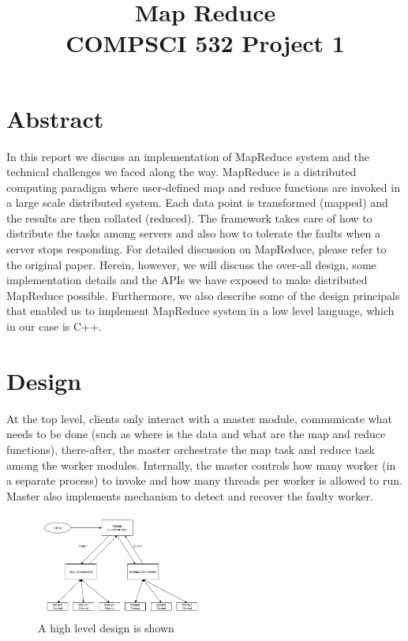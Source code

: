 \documentclass[conference, a4paper]{IEEEtran_ID}
\begin{document}
\title{Map Reduce \\ 
\LARGE{COMPSCI 532 Project 1}
}

\author{
}

\maketitle
\thispagestyle{fancy}


\section{Abstract}
In this report we discuss an implementation of MapReduce\cite{mapreduce} system and the technical challenges we faced along the way. MapReduce is a distributed computing paradigm where user-defined map and reduce functions are invoked in a large scale distributed system. Each data point is transformed (mapped) and the results are then collated (reduced). The framework takes care of how to distribute the tasks among servers and also how to tolerate the faults when a server stops responding. For detailed discussion on MapReduce, please refer to the original paper. Herein, however, we will discuss the over-all design, some implementation details and the APIs we have exposed to make distributed MapReduce possible. Furthermore, we also describe some of the design principals that enabled us to implement MapReduce system in a low level language, which in our case is C++.
 

\section{Design}
At the top level, clients only interact with a master module, communicate what needs to be done (such as where is the data and what are the map and reduce functions), there-after, the master orchestrate the map task and reduce task among the worker modules. Internally, the master controls how many worker (in a separate process) to invoke and how many threads per worker is allowed to run. Master also implements mechanism to detect and recover the faulty worker.

\begin{figure}[htbp]
		\centerline{\includegraphics[width=0.49\textwidth]{high_level_design.png}}
		\caption{A high level design is shown}
\end{figure}
\end{document}
